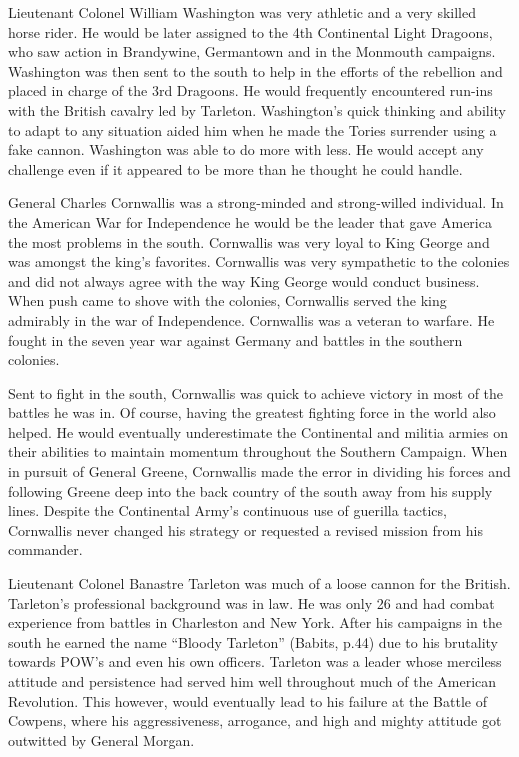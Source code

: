 Lieutenant Colonel William Washington was very athletic and a very skilled horse
rider. He would be later assigned to the 4th Continental Light Dragoons, who saw
action in Brandywine, Germantown and in the Monmouth campaigns. Washington was
then sent to the south to help in the efforts of the rebellion and placed in
charge of the 3rd Dragoons.  He would frequently encountered run-ins with the
British cavalry led by Tarleton.  Washington’s quick thinking and ability to
adapt to any situation aided him when he made the Tories surrender  using a fake
cannon. Washington was able to do more with less.  He would accept any challenge
even if it appeared to be more than he thought he could handle.

General Charles Cornwallis was a strong-minded and strong-willed individual.  In
the American War for Independence he would be the leader that gave America the
most problems in the south.  Cornwallis was very loyal to King George and was
amongst the king’s favorites.  Cornwallis was very sympathetic to the colonies
and did not always agree with the way King George would conduct business. When
push came to shove with the colonies, Cornwallis served the king admirably in
the war of Independence. Cornwallis was a veteran to warfare.  He fought in the
seven year war against Germany and battles in the southern colonies.

Sent to fight in the south, Cornwallis was quick to achieve victory in most of
the battles he was in.  Of course, having the greatest fighting force in the
world also helped.  He would eventually underestimate the Continental and
militia armies on their abilities to maintain momentum throughout the Southern
Campaign.  When in pursuit of General Greene, Cornwallis made the error in
dividing his forces and following Greene deep into the back country of the south
away from his supply lines. Despite the Continental Army’s continuous use of
guerilla tactics, Cornwallis never changed his strategy or requested a revised
mission from his commander. 

Lieutenant Colonel Banastre Tarleton was much of a loose cannon for the British.
Tarleton’s professional background was in law.  He was only 26 and had combat
experience from battles in Charleston and New York.  After his campaigns in the
south he earned the name “Bloody Tarleton” (Babits, p.44) due to his brutality
towards POW’s and even his own officers.  Tarleton was a leader whose merciless
attitude and persistence had served him well throughout much of the American
Revolution.  This however, would eventually lead to his failure at the Battle of
Cowpens, where his aggressiveness, arrogance, and high and mighty attitude got
outwitted by General Morgan. 

